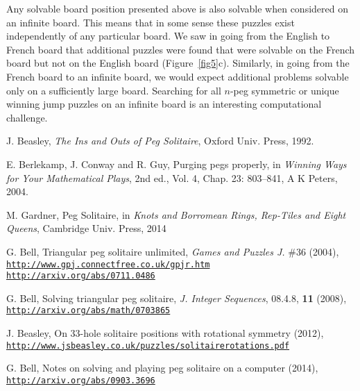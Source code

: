 \documentclass[12pt,reqno]{article}
\begin{document}
Any solvable board position presented above is also solvable when considered on an infinite board.
This means that in some sense these puzzles exist independently of any particular board.
We saw in going from the English to French board that additional puzzles were found that were solvable on the
French board but not on the English board (Figure~\ref{fig5}c).
Similarly, in going from the French board to an infinite board,
we would expect additional problems solvable only on a sufficiently large board.
Searching for all $n$-peg symmetric or unique winning jump puzzles
on an infinite board is an interesting computational challenge.

\begin{thebibliography}{mybib} 

 J. Beasley, \textit{The Ins and Outs of Peg Solitaire}, Oxford Univ. Press, 1992.

 E. Berlekamp, J. Conway and R. Guy, Purging pegs properly, in \textit{Winning Ways for Your Mathematical Plays},
2nd ed., Vol. 4, Chap. 23: 803--841, A K Peters, 2004.

 M. Gardner, Peg Solitaire, in \textit{Knots and Borromean Rings, Rep-Tiles and Eight Queens},
Cambridge Univ. Press, 2014

 G. Bell, Triangular peg solitaire unlimited, {\it Games and Puzzles J.} \#36 (2004),\newline
\href{http://www.gpj.connectfree.co.uk/gpjr.htm}{\tt http://www.gpj.connectfree.co.uk/gpjr.htm}\newline
\href{http://arxiv.org/abs/0711.0486}{\tt http://arxiv.org/abs/0711.0486}

 G. Bell, Solving triangular peg solitaire, \textit{J. Integer Sequences}, 08.4.8, \textbf{11} (2008),\newline
\href{http://arxiv.org/abs/math/0703865}{\tt http://arxiv.org/abs/math/0703865}

 J. Beasley, On 33-hole solitaire positions with rotational symmetry (2012),\newline
\href{http://www.jsbeasley.co.uk/puzzles/solitairerotations.pdf}
{\tt http://www.jsbeasley.co.uk/puzzles/solitairerotations.pdf}

 G. Bell, Notes on solving and playing peg solitaire on a computer (2014), \newline
\href{http://arxiv.org/abs/0903.3696}{\tt http://arxiv.org/abs/0903.3696}


\end{thebibliography}
\end{document}
